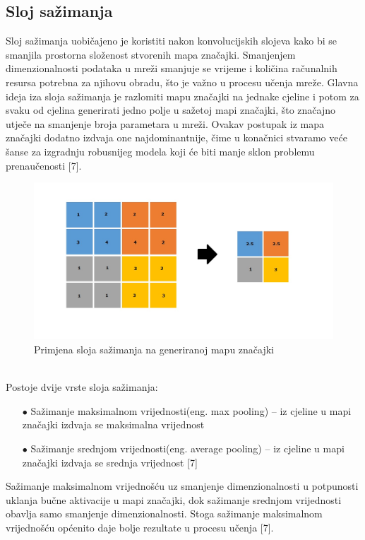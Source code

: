 \documentclass[times, utf8, zavrsni]{fer}
\begin{document}
\subsection*{Sloj sažimanja}

Sloj sažimanja  uobičajeno je koristiti nakon konvolucijskih slojeva kako bi se smanjila prostorna složenost stvorenih mapa značajki. Smanjenjem dimenzionalnosti podataka u mreži smanjuje se vrijeme i količina računalnih resursa potrebna za njihovu obradu, što je važno u procesu učenja mreže. Glavna ideja iza sloja sažimanja je razlomiti mapu značajki na jednake cjeline i potom za svaku od cjelina generirati jedno polje u sažetoj mapi značajki, što značajno utječe na smanjenje broja parametara u mreži. Ovakav postupak iz mapa značajki dodatno izdvaja one najdominantnije, čime u konačnici stvaramo veće šanse za izgradnju robusnijeg modela koji će biti manje sklon problemu prenaučenosti [7].
% 
\begin{figure}[!h]
\centering
\includegraphics[width=1\textwidth]{./slike/pooling}
\caption{Primjena sloja sažimanja na generiranoj mapu značajki}
\label{fig:pooling1}
\end{figure}
%
\\
Postoje dvije vrste sloja sažimanja:
\begin{itemize}
\item[$\bullet$] Sažimanje maksimalnom vrijednosti(eng. max pooling) -- iz cjeline u mapi značajki izdvaja se maksimalna vrijednost
\item[$\bullet$] Sažimanje srednjom vrijednosti(eng. average pooling) -- iz cjeline u mapi značajki izdvaja se srednja vrijednost [7]
\end{itemize}
%
Sažimanje maksimalnom vrijednošću uz smanjenje dimenzionalnosti u potpunosti uklanja bučne aktivacije u mapi značajki, dok sažimanje srednjom vrijednosti obavlja samo smanjenje dimenzionalnosti. Stoga sažimanje maksimalnom vrijednošću općenito daje bolje rezultate u procesu učenja [7].
\newpage
\end{document}
